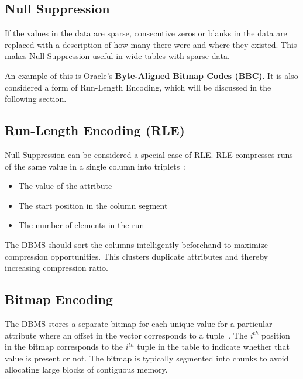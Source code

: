\documentclass[11pt]{article}
\begin{document}
\subsection*{Null Suppression}
If the values in the data are sparse, consecutive zeros or blanks in the data are replaced with a description of how many there were and where they existed. This makes Null Suppression useful in wide tables with sparse data.

An example of this is Oracle’s \textbf{Byte-Aligned Bitmap Codes (BBC)}. It is also considered a form of Run-Length Encoding, which will be discussed in the following section.

\subsection*{Run-Length Encoding (RLE)}
Null Suppression can be considered a special case of RLE. RLE compresses runs of the same value
in a single column into triplets~\cite{p31-roth}:
\begin{itemize}
    \item The value of the attribute
    \item The start position in the column segment
    \item The number of elements in the run
\end{itemize}
The DBMS should sort the columns intelligently beforehand to maximize compression opportunities. This clusters duplicate attributes and thereby increasing compression ratio.

\subsection*{Bitmap Encoding}
The DBMS stores a separate bitmap for each unique value for a particular attribute where an offset
in the vector corresponds to a tuple~\cite{franklin14}. The $i^{th}$ position in the bitmap
corresponds to the $i^{th}$ tuple in the table to indicate whether that value is present or not. The
bitmap is typically segmented into chunks to avoid allocating large blocks of contiguous memory.
\end{document}
